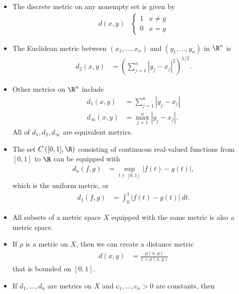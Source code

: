 \begin{example}\hfill
  \begin{itemize}
    \item The discrete metric on any nonempty set is given by
      \begin{align*}
        d\left(x,y\right) & \begin{cases}
          1 & x\neq y\\
          0 & x = y
        \end{cases}
      \end{align*}
    \item The Euclidean metric between $\left(x_1,\dots,x_n\right)$ and $\left(y_1,\dots,y_n\right)$ in $\R^n$ is
      \begin{align*}
        d_{2}\left(x,y\right) &= \left(\sum_{j=1}^{n}\left\vert y_j-x_j \right\vert^2\right)^{1/2}.
      \end{align*}
    \item Other metrics on $\R^n$ include
      \begin{align*}
        d_1\left(x,y\right) &= \sum_{j=1}^{n}\left\vert y_j-x_j \right\vert\\
        d_{\infty}\left(x,y\right) &= \max_{j=1}^{n}\left\vert y_j - x_j \right\vert.
      \end{align*}
      All of $d_1,d_2,d_{\infty}$ are equivalent metrics.
    \item The set $C\left([0,1],\R\right)$ consisting of continuous real-valued functions from $[0,1]$ to $\R$ can be equipped with
      \begin{align*}
        d_u\left(f,g\right) &= \sup_{t\in [0,1]}\left\vert f(t) - g(t) \right\vert,
      \end{align*}
      which is the uniform metric, or
      \begin{align*}
        d_{1}\left(f,g\right) &= \int_{0}^{1} \left\vert f(t)-g(t) \right\vert\:dt.
      \end{align*}
    \item All subsets of a metric space $X$ equipped with the same metric is also a metric space.
    \item If $\rho$ is a metric on $X$, then we can create a distance metric
      \begin{align*}
        d\left(x,y\right) &= \frac{\rho\left(x,y\right)}{1 + \rho\left(x,y\right)}
      \end{align*}
      that is bounded on $[0,1]$.
    \item If $d_1,\dots,d_n$ are metrics on $X$ and $c_1,\dots,c_n > 0$ are constants, then

\end{itemize}
\end{example}
